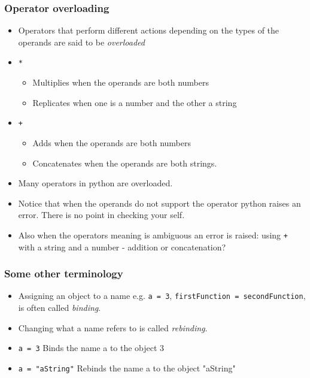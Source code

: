 \documentclass{beamer}
\begin{document}
\begin{frame}
\frametitle{Operator overloading}
\begin{itemize}
\item Operators that perform different actions depending on the types of the operands are said to be {\em overloaded}
\item \texttt{*}
\begin{itemize}
\item Multiplies when the operands are both numbers
\item Replicates when one is a number and the other a string
\end{itemize}
\item \texttt{+}
\begin{itemize}
\item Adds when the operands are both numbers
\item Concatenates when the operands are both strings.
\end{itemize}
\item Many operators in python are overloaded.
\item Notice that when the operands do not support the operator python raises an error. There is no point in checking your self.
\item Also when the operators meaning is ambiguous an error is raised: using \texttt{+} with a string and a number - addition or concatenation?
\end{itemize}
\end{frame}

\begin{frame}
\frametitle{Some other terminology}
\begin{itemize}
\item Assigning an object to a name e.g. \texttt{a = 3}, \texttt{firstFunction = secondFunction}, is often called {\em binding}.
\item Changing  what a name refers to is called {\em rebinding}.
\item \texttt{a = 3}
Binds the name a to the object 3
\item \texttt{a = "aString"}
Rebinds the name a to the object "aString"
\end{itemize}
\end{frame}
\end{document}
